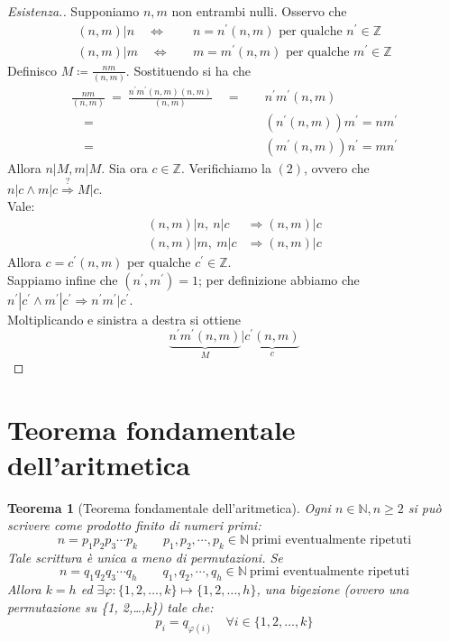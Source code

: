 \documentclass[12pt,twoscolu]{article}
\newcommand{\N}{\mathbb{N}}
\newcommand{\Z}{\mathbb{Z}}
\newcommand{\sesolose}{\Leftrightarrow}
\newcommand{\implica}{\Longrightarrow}
\newcommand{\pr}{\prime}
\newcommand{\pq}{\text{ per qualche }}
\renewcommand\qedsymbol{$\blacksquare$}
\newtheorem{theorem}{Teorema}
\begin{document}
\renewcommand\qedsymbol{$\blacksquare$}
\begin{proof}[Esistenza.]
Supponiamo $n, m$ non entrambi nulli. Osservo che
\begin{align*}
(n, m)|n \quad\sesolose&\quad n = n^{\pr}(n,m) \pq n^{\pr}\in\Z \\
(n, m)|m \quad\sesolose&\quad m = m^{\pr}(n,m) \pq m^{\pr}\in\Z
\end{align*}
Definisco $\displaystyle M \coloneqq \frac{nm}{(n, m)}$. Sostituendo si ha che
\begin{align*}
\frac{nm}{(n, m)}\ = \ \frac{n^{\pr}m^{\pr}(n, m)(n, m)}{(n, m)} \quad=&\quad n^{\pr}m^{\pr}(n,m) \\
\quad=&\quad (n^{\pr}(n, m))m^{\pr} = nm^{\pr} \\
\quad=&\quad (m^{\pr}(n,m))n^{\pr} = mn^{\pr}
\end{align*}
Allora $n | M, m | M$. Sia ora $c \in \Z$. Verifichiamo la $(2)$, ovvero che $n | c \land m | c \stackrel{?}{\implica} M | c$.
\\ Vale:
\begin{align*}
(n, m) | n,\ n|c &\implica (n,m)|c \\
(n, m) | m,\ m|c &\implica (n,m)|c 
\end{align*}
Allora $c = c^{\pr}(n, m) \pq c^{\pr} \in \Z$.
\\Sappiamo infine che $(n^{\pr}, m^{\pr}) = 1$; per definizione abbiamo che $n^{\pr} | c^{\pr} \land m^{\pr} | c^{\pr} \implica n^{\pr}m^{\pr} | c^{\pr}$.
\\Moltiplicando e sinistra a destra si ottiene
$$ \underbrace{n^{\pr}m^{\pr}(n,m)}_M | \underbrace{c^{\pr}(n,m)}_c$$
\end{proof}

\section{Teorema fondamentale dell'aritmetica}
\begin{theorem}[Teorema fondamentale dell'aritmetica]
Ogni $n \in \N, n \ge 2$ si può scrivere come prodotto finito di numeri primi:
$$ n = p_1 p_2 p_3 \cdots p_k\qquad p_1, p_2, \cdots, p_k \in \N \ \text{primi eventualmente ripetuti}$$
Tale scrittura è unica a meno di permutazioni. Se
$$ n = q_1 q_2 q_3 \cdots q_h\qquad q_1, q_2, \cdots, q_h \in \N \ \text{primi eventualmente ripetuti}$$
Allora $k = h$ ed $\exists \varphi : \{1, 2,\ldots ,k\} \mapsto \{1, 2, \ldots , h\}$, una bigezione (ovvero una permutazione su \{1, 2,\ldots ,k\}) tale che:
$$ p_i = q_{\varphi(i)}\quad \forall i \in \{1, 2,\ldots ,k\} $$
\end{theorem}
\end{document}
